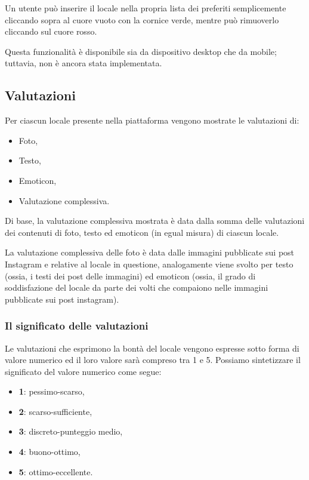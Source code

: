 Un utente può inserire il locale nella propria lista dei preferiti semplicemente cliccando sopra al cuore vuoto con la cornice verde, mentre può rimuoverlo cliccando sul cuore rosso.

Questa funzionalità è disponibile sia da dispositivo desktop che da mobile; tuttavia, non è ancora stata implementata.

\subsection{Valutazioni}

Per ciascun locale presente nella piattaforma vengono mostrate le valutazioni di:

\begin{itemize}
\item Foto,
\item Testo,
\item Emoticon,
\item Valutazione complessiva.
\end{itemize}

Di base, la valutazione complessiva mostrata è data dalla somma delle valutazioni dei contenuti di foto, testo ed emoticon (in egual misura) di ciascun locale.

La valutazione complessiva delle foto è data dalle immagini pubblicate sui post Instagram e relative al locale in questione, analogamente viene svolto per testo (ossia, i testi dei post delle immagini) ed emoticon (ossia, il grado di soddisfazione del locale da parte dei volti che compaiono nelle immagini pubblicate sui post instagram).

\subsubsection{Il significato delle valutazioni}

Le valutazioni che esprimono la bontà del locale vengono espresse sotto forma di valore numerico ed il loro valore sarà compreso tra 1 e 5. Possiamo sintetizzare il significato del valore numerico come segue:

\begin{itemize}
\item \textbf{1}: pessimo-scarso,
\item \textbf{2}: scarso-sufficiente,
\item \textbf{3}: discreto-punteggio medio,
\item \textbf{4}: buono-ottimo,
\item \textbf{5}: ottimo-eccellente.
\end{itemize}

